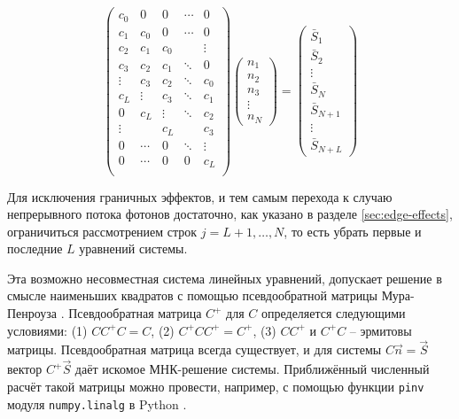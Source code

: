 \begin{equation}
	\begin{pmatrix} 
		c_0   &  0   &  0   &\dotsm&  0     \\
		c_1   & c_0  &  0   &\dotsm&  0     \\
		c_2   & c_1  & c_0  &      & \vdots \\
		c_3   & c_2  & c_1  &\ddots&  0     \\
		\vdots& c_3  & c_2  &\ddots&  c_0   \\
		c_L   &\vdots& c_3  &\ddots&  c_1   \\
		0     & c_L  &\vdots&\ddots&  c_2   \\
		\vdots&      & c_L  &      &  c_3   \\
		0     &\dotsm&  0   &\ddots& \vdots \\
		0     &\dotsm& 0    &   0  &  c_L   \\
	\end{pmatrix}
	\begin{pmatrix} 
		n_1 \\ n_2 \\ n_3 \\ \vdots \\ n_N
	\end{pmatrix}
	=
	\begin{pmatrix} 
		\bar{S}_1 \\ \bar{S}_2 \\
		\vdots \\
		\bar{S}_N \\ \bar{S}_{N+1} \\
		\vdots \\
		\bar{S}_{N+L}
	\end{pmatrix}
	\label{eq:mean-vector-calculation}
\end{equation}

Для исключения граничных эффектов, и тем самым перехода к случаю непрерывного потока фотонов достаточно, как указано в разделе \ref{sec:edge-effects}, ограничиться рассмотрением строк $j = L+1, \ldots, N$, то есть убрать первые и последние $L$ уравнений системы.

Эта возможно несовместная система линейных уравнений, допускает решение в смысле наименьших квадратов с помощью псевдообратной матрицы Мура-Пенроуза \cite{Penrose1956}. Псевдообратная матрица $C^+$ для $C$ определяется следующими условиями: (1) $C C^+ C = C$, (2) $C^+ C C^+ = C^+$, (3) $C C^+$ и $C^+ C$ -- эрмитовы матрицы. Псевдообратная матрица всегда существует, и для системы $C\vec{n} = \vec{S}$ вектор $C^+ \vec{S}$ даёт искомое МНК-решение системы. Приближённый численный расчёт такой матрицы можно провести, например, с помощью функции \verb|pinv| модуля \verb|numpy.linalg| в Python \cite{Harris2020}.


